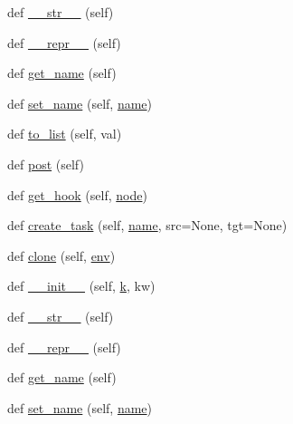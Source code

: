 \begin{DoxyCompactItemize}
\item 
def \hyperlink{classwaflib_1_1_task_gen_1_1task__gen_a48c763160308a6ff809b7048702618b1}{\+\_\+\+\_\+str\+\_\+\+\_\+} (self)
\item 
def \hyperlink{classwaflib_1_1_task_gen_1_1task__gen_a040db536e5d7fe5054c9e9da52f36eb0}{\+\_\+\+\_\+repr\+\_\+\+\_\+} (self)
\item 
def \hyperlink{classwaflib_1_1_task_gen_1_1task__gen_a50370e76b549fc3bd0369c35f4fc1bab}{get\+\_\+name} (self)
\item 
def \hyperlink{classwaflib_1_1_task_gen_1_1task__gen_a79705c7a6b9b09021ee549e428c5a5c1}{set\+\_\+name} (self, \hyperlink{lib_2expat_8h_a1b49b495b59f9e73205b69ad1a2965b0}{name})
\item 
def \hyperlink{classwaflib_1_1_task_gen_1_1task__gen_a31a9f508654465cd5fe9f3baaaf77ec4}{to\+\_\+list} (self, val)
\item 
def \hyperlink{classwaflib_1_1_task_gen_1_1task__gen_aa00dedae17f7fa03c169f0e4bdab7414}{post} (self)
\item 
def \hyperlink{classwaflib_1_1_task_gen_1_1task__gen_a19b53157d4411479cf8f55e0ef0edfec}{get\+\_\+hook} (self, \hyperlink{structnode}{node})
\item 
def \hyperlink{classwaflib_1_1_task_gen_1_1task__gen_ad432ecefdf2362d1cccf1dad31fac2d3}{create\+\_\+task} (self, \hyperlink{lib_2expat_8h_a1b49b495b59f9e73205b69ad1a2965b0}{name}, src=None, tgt=None)
\item 
def \hyperlink{classwaflib_1_1_task_gen_1_1task__gen_a7b7e036b797a0532ce6be8df951ba048}{clone} (self, \hyperlink{classwaflib_1_1_task_gen_1_1task__gen_a4d6f968ce8718fdf77d46ea3b56def1e}{env})
\item 
def \hyperlink{classwaflib_1_1_task_gen_1_1task__gen_a17ba35bed2219481190d515ffef57404}{\+\_\+\+\_\+init\+\_\+\+\_\+} (self, \hyperlink{rfft2d_test_m_l_8m_adc468c70fb574ebd07287b38d0d0676d}{k}, kw)
\item 
def \hyperlink{classwaflib_1_1_task_gen_1_1task__gen_a48c763160308a6ff809b7048702618b1}{\+\_\+\+\_\+str\+\_\+\+\_\+} (self)
\item 
def \hyperlink{classwaflib_1_1_task_gen_1_1task__gen_a040db536e5d7fe5054c9e9da52f36eb0}{\+\_\+\+\_\+repr\+\_\+\+\_\+} (self)
\item 
def \hyperlink{classwaflib_1_1_task_gen_1_1task__gen_a50370e76b549fc3bd0369c35f4fc1bab}{get\+\_\+name} (self)
\item 
def \hyperlink{classwaflib_1_1_task_gen_1_1task__gen_a79705c7a6b9b09021ee549e428c5a5c1}{set\+\_\+name} (self, \hyperlink{lib_2expat_8h_a1b49b495b59f9e73205b69ad1a2965b0}{name})

\end{DoxyCompactItemize}
